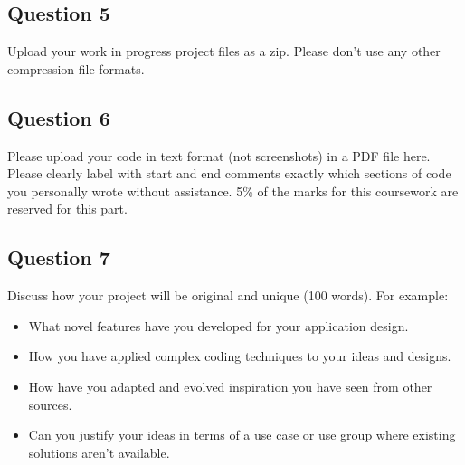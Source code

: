 \subsection*{Question 5}
Upload your work in progress project files as a zip. Please don’t use any other compression file formats.

\subsection*{Question 6}
Please upload your code in text format (not screenshots) in a PDF file here.
Please clearly label with start and end comments exactly which sections of code you personally wrote without assistance.
5\% of the marks for this coursework are reserved for this part. 

\subsection*{Question 7}
Discuss how your project will be original and unique (100 words). For example:
\begin{itemize}
  \item What novel features have you developed for your application design.
  \item How you have applied complex coding techniques to your ideas and designs.
  \item How have you adapted and evolved inspiration you have seen from other sources.
  \item Can you justify your ideas in terms of a use case or use group where existing solutions aren't available.
\end{itemize}

